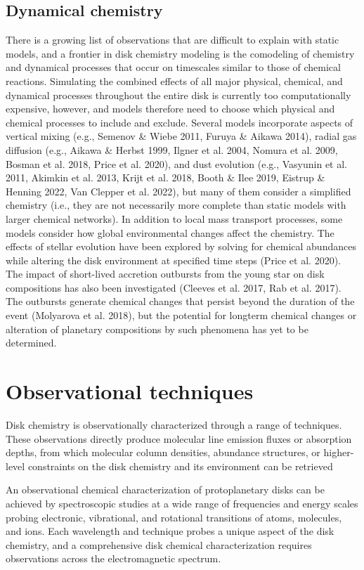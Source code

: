 \subsection{Dynamical chemistry}
There is a growing list of observations that are difficult to explain with static models, and a frontier in disk chemistry modeling is the comodeling of chemistry and dynamical processes that occur on timescales similar to those of chemical reactions. Simulating the combined effects of all major physical, chemical, and dynamical processes throughout the entire disk is currently too computationally expensive, however, and models therefore need to choose which physical and chemical processes to include and exclude. Several models incorporate aspects of vertical mixing (e.g., Semenov \& Wiebe 2011, Furuya \& Aikawa 2014), radial gas diffusion (e.g., Aikawa \& Herbst 1999, Ilgner et al. 2004, Nomura et al. 2009, Bosman et al. 2018, Price et al. 2020), and dust evolution (e.g., Vasyunin et al. 2011, Akimkin et al. 2013, Krijt et al. 2018, Booth \& Ilee 2019, Eistrup \& Henning 2022, Van Clepper et al. 2022), but many of them consider a simplified chemistry (i.e., they are not necessarily more complete than static models with larger chemical networks).
In addition to local mass transport processes, some models consider how global environmental changes affect the chemistry. The effects of stellar evolution have been explored by solving for chemical abundances while altering the disk environment at specified time steps (Price et al. 2020). The impact of short-lived accretion outbursts from the young star on disk compositions has also been investigated (Cleeves et al. 2017, Rab et al. 2017). The outbursts generate chemical changes that persist beyond the duration of the event (Molyarova et al. 2018), but the potential for longterm chemical changes or alteration of planetary compositions by such phenomena has yet to be determined.
\section{Observational techniques}
Disk chemistry is observationally characterized through a range of techniques. These observations directly produce molecular line emission fluxes or absorption depths, from which molecular column densities, abundance structures, or higher-level constraints on the disk chemistry and its environment can be retrieved

An observational chemical characterization of protoplanetary disks can be achieved by spectroscopic studies at a wide range of frequencies and energy scales probing electronic, vibrational, and rotational transitions of atoms, molecules, and ions. Each wavelength and technique probes a unique aspect of the disk chemistry, and a comprehensive disk chemical characterization requires observations across the electromagnetic spectrum.

